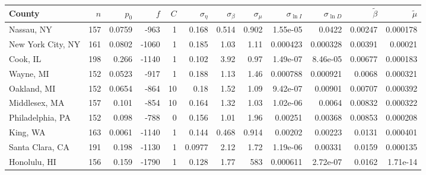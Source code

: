 \documentclass[12pt,letterpaper]{article}
\begin{document}
{\begin{appendices}
\begin{sidewaystable}
{\begin{tabular}{lrrrrrrrrrrr}
\hline
 County             &   $n$ &   $p_0$ &   $f$ &   $C$ &   $\sigma_\eta$ &   $\sigma_\beta$ &   $\sigma_\mu$ &   $\sigma_{\ln I}$ &   $\sigma_{\ln D}$ &   $\tilde{\beta}$ &   $\tilde{\mu}$ \\
\hline
 Nassau, NY         & 157   & 0.0759  &  -963 &     1 &          0.168  &            0.514 &          0.902 &          1.55e-05  &           0.0422   &           0.00247 &        0.000178 \\
 New York City, NY  & 161   & 0.0802  & -1060 &     1 &          0.185  &            1.03  &          1.11  &          0.000423  &           0.000328 &           0.00391 &        0.00021  \\
 Cook, IL           & 198   & 0.266   & -1140 &     1 &          0.102  &            3.92  &          0.97  &          1.49e-07  &           8.46e-05 &           0.00677 &        0.000183 \\
 Wayne, MI          & 152   & 0.0523  &  -917 &     1 &          0.188  &            1.13  &          1.46  &          0.000788  &           0.000921 &           0.0068  &        0.000321 \\
 Oakland, MI        & 152   & 0.0654  &  -864 &    10 &          0.18   &            1.52  &          1.09  &          9.42e-07  &           0.00901  &           0.00707 &        0.000392 \\
 Middlesex, MA      & 157   & 0.101   &  -854 &    10 &          0.164  &            1.32  &          1.03  &          1.02e-06  &           0.0064   &           0.00832 &        0.000322 \\
 Philadelphia, PA   & 152   & 0.098   &  -788 &     0 &          0.156  &            1.01  &          1.96  &          0.00251   &           0.00368  &           0.00853 &        0.000208 \\
 King, WA           & 163   & 0.0061  & -1140 &     1 &          0.144  &            0.468 &          0.914 &          0.00202   &           0.00223  &           0.0131  &        0.000401 \\
 Santa Clara, CA    & 191   & 0.198   & -1130 &     1 &          0.0977 &            2.12  &          1.72  &          1.19e-06  &           0.00331  &           0.0159  &        0.000135 \\
 Honolulu, HI       & 156   & 0.159   & -1790 &     1 &          0.128  &            1.77  &        583     &          0.000611  &           2.72e-07 &           0.0162  &        1.71e-14 \\

\end{tabular}}
\end{sidewaystable}
\end{appendices}}
\end{document}
